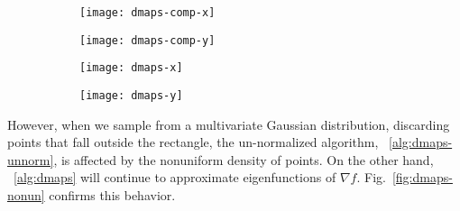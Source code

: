 \begin{figure}
  \centering
  \begin{subfigure}[t]{0.45\linewidth}
    \centering
    \texttt{[image: dmaps-comp-x]}
  \end{subfigure}
  \begin{subfigure}[t]{0.45\linewidth}
    \centering
    \texttt{[image: dmaps-comp-y]}
  \end{subfigure}
  \caption{ \label{fig:dmaps-comp} }
\end{figure}

\begin{figure}
  \centering
  \begin{subfigure}[t]{0.45\linewidth}
    \centering
    \texttt{[image: dmaps-x]}
  \end{subfigure}
  \begin{subfigure}[t]{0.45\linewidth}
    \centering
    \texttt{[image: dmaps-y]}
  \end{subfigure}
  \caption{ \label{fig:dmaps-xy} }
\end{figure}

However, when we sample from a multivariate Gaussian
distribution, discarding points that fall outside the rectangle, the
un-normalized algorithm, ~\ref{alg:dmaps-unnorm}, is affected by the
nonuniform density of points. On the other hand, ~\ref{alg:dmaps} will
continue to approximate eigenfunctions of $\nabla
f$. Fig.~\ref{fig:dmaps-nonun} confirms this behavior.


